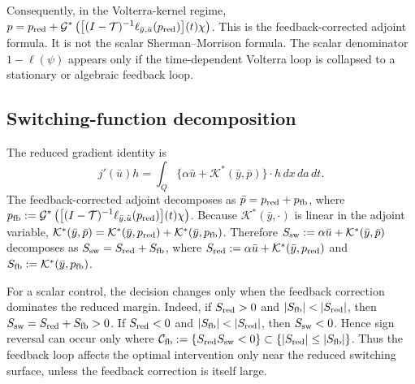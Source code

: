 \documentclass[pdflatex,sn-mathphys-num]{sn-jnl}
\theoremstyle{plain}
\theoremstyle{definition}
\theoremstyle{remark}
\begin{document}
Consequently, in the Volterra-kernel regime,
$\displaystyle p=p_{\rm red}
+\mathcal G^*\left(
\big[(I-\mathcal T)^{-1}\ell_{\bar y,\bar u}(p_{\rm red})\big](t)\chi
\right)$.
This is the feedback-corrected adjoint formula. It is not the scalar
Sherman--Morrison formula. The scalar denominator \(1-\ell(\psi)\) appears
only if the time-dependent Volterra loop is collapsed to a stationary or
algebraic feedback loop.

\subsection{Switching-function decomposition}
\label{app:switching}

The reduced gradient identity is
\[
j'(\bar u)h
=
\int_Q\{\alpha\bar u+\mathcal K^*(\bar y,\bar p)\}\cdot h\,dx\,da\,dt .
\]
The feedback-corrected adjoint decomposes as \(\bar p=p_{\rm red}+p_{\rm fb}\),
where
$\displaystyle p_{\rm fb}:=
\mathcal G^*\left(
\big[(I-\mathcal T)^{-1}\ell_{\bar y,\bar u}(p_{\rm red})\big](t)\chi
\right)$.
Because \(\mathcal K^*(\bar y,\cdot)\) is linear in the adjoint variable,
\(\mathcal K^*(\bar y,\bar p)=\mathcal K^*(\bar y,p_{\rm red})
+\mathcal K^*(\bar y,p_{\rm fb})\). Therefore
\(S_{\rm sw}:=\alpha\bar u+\mathcal K^*(\bar y,\bar p)\) decomposes as
\(S_{\rm sw}=S_{\rm red}+S_{\rm fb}\), where
\(S_{\rm red}:=\alpha\bar u+\mathcal K^*(\bar y,p_{\rm red})\) and
\(S_{\rm fb}:=\mathcal K^*(\bar y,p_{\rm fb})\).

For a scalar control, the decision changes only when the feedback correction
dominates the reduced margin. Indeed, if \(S_{\rm red}>0\) and
\(|S_{\rm fb}|<|S_{\rm red}|\), then \(S_{\rm sw}=S_{\rm red}+S_{\rm fb}>0\).
If \(S_{\rm red}<0\) and \(|S_{\rm fb}|<|S_{\rm red}|\), then
\(S_{\rm sw}<0\). Hence sign reversal can occur only where
$\displaystyle \mathcal C_{\rm fb}:=\{S_{\rm red}S_{\rm sw}<0\}
\subset
\{|S_{\rm red}|\le |S_{\rm fb}|\}$.
Thus the feedback loop affects the optimal intervention only near the reduced
switching surface, unless the feedback correction is itself large.


\end{document}
